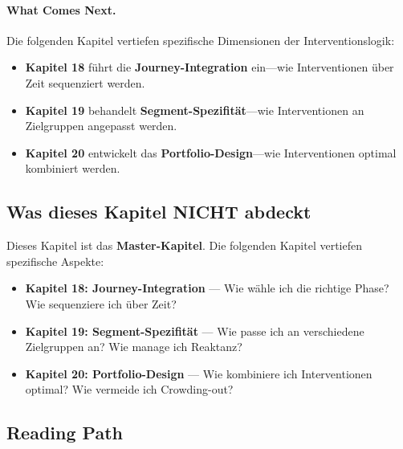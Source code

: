 \paragraph{What Comes Next.}
Die folgenden Kapitel vertiefen spezifische Dimensionen der Interventionslogik:
\begin{itemize}[nosep]
\item \textbf{Kapitel 18} führt die \textbf{Journey-Integration} ein---wie Interventionen über Zeit sequenziert werden.
\item \textbf{Kapitel 19} behandelt \textbf{Segment-Spezifität}---wie Interventionen an Zielgruppen angepasst werden.
\item \textbf{Kapitel 20} entwickelt das \textbf{Portfolio-Design}---wie Interventionen optimal kombiniert werden.
\end{itemize}


\subsection{Was dieses Kapitel NICHT abdeckt}

Dieses Kapitel ist das \textbf{Master-Kapitel}. Die folgenden Kapitel vertiefen spezifische Aspekte:

\begin{itemize}
\item \textbf{Kapitel 18: Journey-Integration} --- Wie wähle ich die richtige Phase? Wie sequenziere ich über Zeit?
\item \textbf{Kapitel 19: Segment-Spezifität} --- Wie passe ich an verschiedene Zielgruppen an? Wie manage ich Reaktanz?
\item \textbf{Kapitel 20: Portfolio-Design} --- Wie kombiniere ich Interventionen optimal? Wie vermeide ich Crowding-out?
\end{itemize}


\subsection{Reading Path}
\label{sec:17-reading-path}

